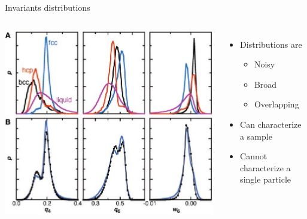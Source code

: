 \begin{frame}{Invariants distributions}
	\begin{columns}
	\includegraphics[width=\columnwidth]{gasser_invariants}
	\begin{itemize}
		\item Distributions are
		\begin{itemize}
			\item Noisy
			\item Broad
			\item Overlapping
		\end{itemize}
		\item Can characterize a sample
		\item Cannot characterize a single particle
	\end{itemize}
	\end{columns}
	\footnotesize{}
\end{frame}

